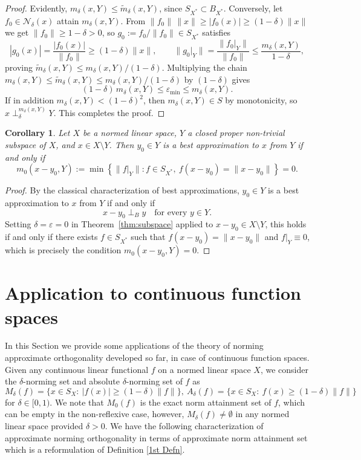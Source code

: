 \documentclass[11pt, reqno]{amsart}
\newtheorem{corollary}[theorem]{Corollary}
\theoremstyle{definition}
\begin{document}
\begin{proof}
\medskip

\noindent Evidently, $m_\delta(x,Y)\leq \widetilde m_\delta(x,Y)$, since $S_{X^*}\subset B_{X^*}$. Conversely, let $f_0 \in \mathscr{N}_\delta(x)$ attain $m_\delta(x,Y)$. From
$\|f_0\|\,\|x\|\geq|f_0(x)| \geq (1-\delta)\|x\|$ we get $\|f_0\| \geq 1-\delta > 0$, so
$g_0 := f_0/\|f_0\| \in S_{X^*}$ satisfies
\[
|g_0(x)| = \frac{|f_0(x)|}{\|f_0\|} \geq (1-\delta)\|x\|,\qquad
\|g_0|_Y\| = \frac{\|f_0|_Y\|}{\|f_0\|}\leq \frac{m_\delta(x,Y)}{1-\delta},
\]
proving $\widetilde m_\delta(x,Y)\leq m_\delta(x,Y)/(1-\delta)$. Multiplying the chain
$m_\delta(x,Y)\leq \widetilde m_\delta(x,Y)\leq m_\delta(x,Y)/(1-\delta)$ by $(1-\delta)$
gives
\[
(1-\delta)\,m_\delta(x,Y) \leq \varepsilon_{\min} \leq m_\delta(x,Y).
\]
If in addition $m_\delta(x,Y)<(1-\delta)^2$, then $m_\delta(x,Y)\in S$ by monotonicity, so
$x \perp_\delta^{m_\delta(x,Y)} Y$. This completes the proof.
\end{proof}


\begin{corollary}
Let $X$ be a normed linear space, $Y$ a closed proper non-trivial subspace 
of $X$, and $x \in X \setminus Y$. Then $y_0 \in Y$ is a best approximation 
to $x$ from $Y$ if and only if
\[
m_0(x-y_0, Y) := \min\left\{\|f|_Y\| : f \in S_{X^*},\ 
f(x - y_0) = \|x - y_0\|\right\} = 0.
\]
\end{corollary}

\begin{proof}
By the classical characterization of best approximations, $y_0 \in Y$ is 
a best approximation to $x$ from $Y$ if and only if
\[
x - y_0 \perp_B y \quad \text{for every } y \in Y.
\]
Setting $\delta = \varepsilon = 0$ in Theorem~\ref{thm:subspace} applied 
to $x - y_0 \in X \setminus Y$, this holds if and only if there exists 
$f \in S_{X^*}$ such that $f(x-y_0) = \|x-y_0\|$ and $f|_Y \equiv 0$, 
which is precisely the condition $m_0(x-y_0, Y) = 0$.
\end{proof}

\section{Application to continuous function spaces}\label{sec:ck}

\noindent In this Section we provide some applications of the theory of norming approximate orthogonality developed so far, in case of continuous function spaces. Given any continuous linear functional $f$ on a normed linear space $X$, we consider the $\delta$-norming set and absolute $\delta$-norming set of $f$ as 
\[
M_\delta(f) = \{x\in S_X:~|f(x)|\geq (1-\delta)\|f\|\},~A_\delta(f) = \{x\in S_X:~f(x)\geq (1-\delta)\|f\|\}
\]
for  $\delta\in[0,1)$. We note that $M_0(f)$ is the exact norm attainment set of $f$, which can be empty in the non-reflexive case, however, $M_\delta(f)\neq \emptyset$ in any normed linear space provided $\delta > 0$. We have the following characterization of approximate norming orthogonality in terms of approximate norm attainment set which is a reformulation of Definition \ref{1st Defn}. 
\end{document}
